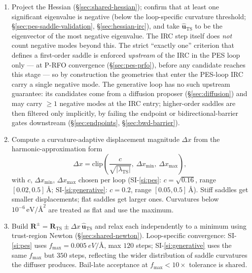 \begin{enumerate}
    \item Project the Hessian (\S\ref{sec:shared-hessian}); confirm that at least one significant eigenvalue is negative (below the loop-specific curvature threshold; \S\ref{sec:pes-saddle-validation}, \S\ref{sec:hessian-irc}), and take $\hat{\mathbf{u}}_\text{TS}$ to be the eigenvector of the most negative eigenvalue. The IRC step itself does \emph{not} count negative modes beyond this. The strict ``exactly one'' criterion that defines a first-order saddle is enforced \emph{upstream} of the IRC in the PES loop only --- at P-RFO convergence (\S\ref{sec:pes-prfo}), before any candidate reaches this stage --- so by construction the geometries that enter the PES-loop IRC carry a single negative mode. The generative loop has no such upstream guarantee: its candidates come from a diffusion proposer (\S\ref{sec:diffusion}) and may carry $\geq 1$ negative modes at the IRC entry; higher-order saddles are then filtered only implicitly, by failing the endpoint or bidirectional-barrier gates downstream (\S\ref{sec:endpoints}, \S\ref{sec:bwd-barrier}).

    \item Compute a curvature-adaptive displacement magnitude $\Delta x$ from the harmonic-approximation form
    \begin{equation}
        \Delta x = \mathrm{clip}\!\left(\frac{c}{\sqrt{|\lambda_\text{TS}|}},\ \Delta x_\text{min},\ \Delta x_\text{max}\right),
    \end{equation}
    with $c$, $\Delta x_\text{min}$, $\Delta x_\text{max}$ chosen per loop (SI-\ref{si:pes}: $c = \sqrt{0.16}$, range $[0.02, 0.5]\,\si{\angstrom}$; SI-\ref{si:generative}: $c = 0.2$, range $[0.05, 0.5]\,\si{\angstrom}$). Stiff saddles get smaller displacements; flat saddles get larger ones. Curvatures below $10^{-6}\,\text{eV/\AA}^2$ are treated as flat and use the maximum.

    \item Build $\mathbf{R}^\pm = \mathbf{R}_\text{TS} \pm \Delta x\,\hat{\mathbf{u}}_\text{TS}$ and relax each independently to a minimum using trust-region Newton (\S\ref{sec:shared-newton}). Loop-specific convergence: SI-\ref{si:pes} uses $f_\text{max} = \SI{0.005}{eV/\angstrom}$, max $120$ steps; SI-\ref{si:generative} uses the same $f_\text{max}$ but $350$ steps, reflecting the wider distribution of saddle curvatures the diffuser produces. Bail-late acceptance at $f_\text{max} < 10\times$ tolerance is shared.


\end{enumerate}
